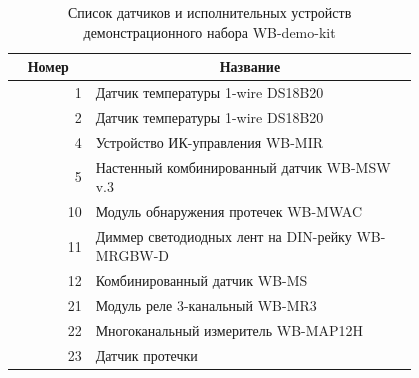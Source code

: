 \documentclass[a4paper,14pt]{extarticle}
\begin{document}
\begin{center}
	\begin{table}[htbp]
	\begin{tabular}{|r|p{0.8\linewidth}|}
		\hline
		\multicolumn{1}{|c|}{\textbf{Номер}} & \multicolumn{1}{c|}{\textbf{Название}} \\ \hline\hline
		1 & Датчик температуры 1-wire DS18B20 \\ \hline
		2 & Датчик температуры 1-wire DS18B20 \\ \hline
		4 & Устройство ИК-управления WB-MIR \\ \hline
		5 & Настенный комбинированный датчик WB-MSW v.3 \\ \hline
		10 & Модуль обнаружения протечек WB-MWAC \\ \hline
		11 & Диммер светодиодных лент на DIN-рейку WB-MRGBW-D \\ \hline
		12 & Комбинированный датчик WB-MS \\ \hline
		21 & Модуль реле 3-канальный WB-MR3 \\ \hline
		22 & Многоканальный измеритель WB-MAP12H \\ \hline
		23 & Датчик протечки \\ \hline
	\end{tabular}
    \caption{Список датчиков и исполнительных устройств демонстрационного набора WB-demo-kit}
	\label{tab:device-list}
\end{table}
\end{center}	
\end{document}
